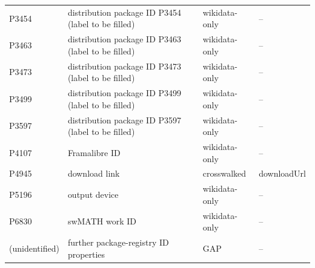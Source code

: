 \begin{longtable}{llll}
P3454 & distribution package ID P3454 (label to be filled) & wikidata-only & -- \\
P3463 & distribution package ID P3463 (label to be filled) & wikidata-only & -- \\
P3473 & distribution package ID P3473 (label to be filled) & wikidata-only & -- \\
P3499 & distribution package ID P3499 (label to be filled) & wikidata-only & -- \\
P3597 & distribution package ID P3597 (label to be filled) & wikidata-only & -- \\
P4107 & Framalibre ID & wikidata-only & -- \\
P4945 & download link & crosswalked & downloadUrl \\
P5196 & output device & wikidata-only & -- \\
P6830 & swMATH work ID & wikidata-only & -- \\
(unidentified) & further package-registry ID properties & GAP & -- \\
\hline
\end{longtable}
